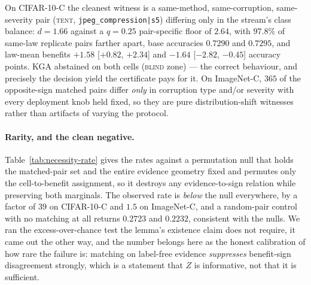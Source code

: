 On CIFAR-10-C the cleanest witness is a same-method, same-corruption, same-severity pair
(\textsc{tent}, \texttt{jpeg\_compression|s5}) differing only in the stream's class balance:
$d=1.66$ against a $q{=}0.25$ pair-specific floor of $2.64$, with $97.8\%$ of same-law replicate
pairs farther apart, base accuracies $0.7290$ and $0.7295$, and law-mean benefits $+1.58$
[$+0.82$, $+2.34$] and $-1.64$ [$-2.82$, $-0.45$] accuracy points. \textsc{KGA} abstained on both
cells (\textsc{blind} zone) --- the correct behaviour, and precisely the decision yield the
certificate pays for it. On ImageNet-C, $365$ of the opposite-sign matched pairs differ
\emph{only} in corruption type and/or severity with every deployment knob held fixed, so they are
pure distribution-shift witnesses rather than artifacts of varying the protocol.

\paragraph{Rarity, and the clean negative.} Table~\ref{tab:necessity-rate} gives the rates against
a permutation null that holds the matched-pair set and the entire evidence geometry fixed and
permutes only the cell-to-benefit assignment, so it destroys any evidence-to-sign relation while
preserving both marginals. The observed rate is \emph{below} the null everywhere, by a factor of
$39$ on CIFAR-10-C and $1.5$ on ImageNet-C, and a random-pair control with no matching at all
returns $0.2723$ and $0.2232$, consistent with the nulls. We ran the excess-over-chance test the
lemma's existence claim does not require, it came out the other way, and the number belongs here as
the honest calibration of how rare the failure is: matching on label-free evidence \emph{suppresses}
benefit-sign disagreement strongly, which is a statement that $Z$ is informative, not that it is
sufficient.

